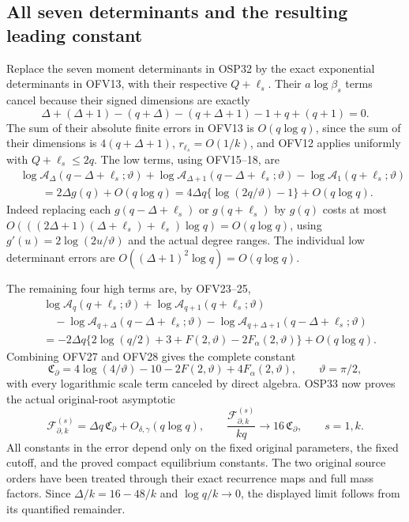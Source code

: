 \documentclass[11pt,a4paper]{article}
\begin{document}
\subsection{All seven determinants and the resulting leading constant}

Replace the seven moment determinants in OSP32 by the exact
exponential determinants in OFV13, with their respective
$Q+\ell_s$. Their $a\log\beta_s$ terms cancel because their
signed dimensions are exactly
\[
\Delta+(\Delta+1)-(q+\Delta)-(q+\Delta+1)-1+q+(q+1)=0.
\tag{OFV26}
\]
The sum of their absolute finite errors in OFV13 is
$O(q\log q)$, since the sum of their dimensions is
$4(q+\Delta+1)$, $r_{\ell_s}=O(1/k)$, and OFV12 applies
uniformly with $Q+\ell_s\le2q$.
The low terms, using OFV15--18, are
\[
\begin{split}
&\log\mathcal A_\Delta(q-\Delta+\ell_s;\vartheta)
+\log\mathcal A_{\Delta+1}(q-\Delta+\ell_s;\vartheta)
-\log\mathcal A_1(q+\ell_s;\vartheta)\\
&\qquad=2\Delta g(q)+O(q\log q)
=4\Delta q\{\log(2q/\vartheta)-1\}+O(q\log q).
\end{split}\tag{OFV27}
\]
Indeed replacing each $g(q-\Delta+\ell_s)$ or $g(q+\ell_s)$
by $g(q)$ costs at most
$O(((2\Delta+1)(\Delta+\ell_s)+\ell_s)\log q)=O(q\log q)$,
using $g'(u)=2\log(2u/\vartheta)$ and the actual degree ranges.
The individual low determinant errors are
$O((\Delta+1)^2\log q)=O(q\log q)$.

The remaining four high terms are, by OFV23--25,
\[
\begin{split}
&\log\mathcal A_q(q+\ell_s;\vartheta)
+\log\mathcal A_{q+1}(q+\ell_s;\vartheta)\\
&\quad-\log\mathcal A_{q+\Delta}(q-\Delta+\ell_s;\vartheta)
-\log\mathcal A_{q+\Delta+1}(q-\Delta+\ell_s;\vartheta)\\
&=-2\Delta q
\{2\log(q/2)+3+F(2,\vartheta)-2F_\alpha(2,\vartheta)\}
+O(q\log q).
\end{split}\tag{OFV28}
\]
Combining OFV27 and OFV28 gives the complete constant
\[
\mathfrak C_{\partial}
=4\log(4/\vartheta)-10-2F(2,\vartheta)+4F_\alpha(2,\vartheta),
\qquad \vartheta=\pi/2,
\tag{OFV29}
\]
with every logarithmic scale term canceled by direct algebra.
OSP33 now proves the actual original-root asymptotic
\[
\boxed{\displaystyle
\mathcal F_{\partial,k}^{(s)}
=\Delta q\,\mathfrak C_{\partial}
   +O_{\delta,\gamma}(q\log q),\qquad
\frac{\mathcal F_{\partial,k}^{(s)}}{kq}
\longrightarrow16\,\mathfrak C_{\partial},
\qquad s=1,k.}
\tag{OFV30}
\]
All constants in the error depend only on the fixed original
parameters, the fixed cutoff, and the proved compact equilibrium
constants. The two original source orders have been treated
through their exact recurrence maps and full mass factors.
Since $\Delta/k=16-48/k$ and $\log q/k\to0$, the displayed
limit follows from its quantified remainder.
\end{document}
